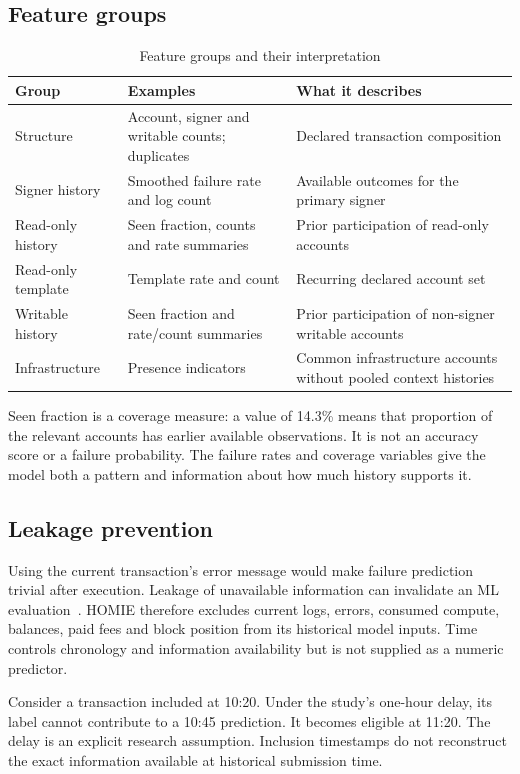 \documentclass[12pt,a4paper,oneside]{report}
\begin{document}
\subsection{Feature groups}
\begin{table}[H]\centering\caption{Feature groups and their interpretation}
\small\begin{tabularx}{\textwidth}{p{29mm}YY}\toprule Group&Examples&What it describes\\\midrule
Structure&Account, signer and writable counts; duplicates&Declared transaction composition\\
Signer history&Smoothed failure rate and log count&Available outcomes for the primary signer\\
Read-only history&Seen fraction, counts and rate summaries&Prior participation of read-only accounts\\
Read-only template&Template rate and count&Recurring declared account set\\
Writable history&Seen fraction and rate/count summaries&Prior participation of non-signer writable accounts\\
Infrastructure&Presence indicators&Common infrastructure accounts without pooled context histories\\\bottomrule\end{tabularx}\end{table}
Seen fraction is a coverage measure: a value of 14.3\% means that proportion of the relevant accounts has earlier available observations. It is not an accuracy score or a failure probability. The failure rates and coverage variables give the model both a pattern and information about how much history supports it.
\subsection{Leakage prevention}
Using the current transaction's error message would make failure prediction trivial after execution. Leakage of unavailable information can invalidate an ML evaluation~\cite{leakage}. HOMIE therefore excludes current logs, errors, consumed compute, balances, paid fees and block position from its historical model inputs. Time controls chronology and information availability but is not supplied as a numeric predictor.

Consider a transaction included at 10:20. Under the study's one-hour delay, its label cannot contribute to a 10:45 prediction. It becomes eligible at 11:20. The delay is an explicit research assumption. Inclusion timestamps do not reconstruct the exact information available at historical submission time.
\end{document}
